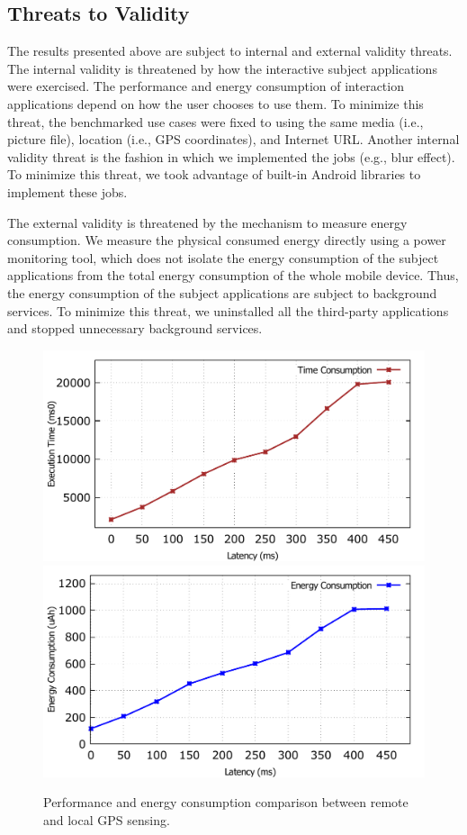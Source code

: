 \documentclass{sig-alternate}
\begin{document}
\subsection{Threats to Validity}
The results presented above are subject to internal and external validity threats. The internal validity is threatened by how the interactive subject applications were exercised. The performance and energy consumption of interaction applications depend on how the user chooses to use them. To minimize this threat, the benchmarked use cases were fixed to using the same media (i.e., picture file), location (i.e., GPS coordinates), and Internet URL. Another internal validity threat is the fashion in which we implemented the jobs (e.g., blur effect). To minimize this threat, we took advantage of built-in Android libraries to implement these jobs.

The external validity is threatened by the mechanism to measure energy consumption. We measure the physical consumed energy directly using a power monitoring tool, which does not isolate the energy consumption of the subject applications from the total energy consumption of the whole mobile device. Thus, the energy consumption of the subject applications are subject to background services. To minimize this threat, we uninstalled all the third-party applications and stopped unnecessary background services.

\begin{figure}
	\centering
		\includegraphics[width=.42\textwidth]{data/off_multi_perf.pdf}
		\includegraphics[width=.42\textwidth]{data/off_multi_energy.pdf}
	\caption{Performance and energy consumption comparison between remote and local GPS sensing.}
	\label{fig:off_all}
\end{figure}
\end{document}
